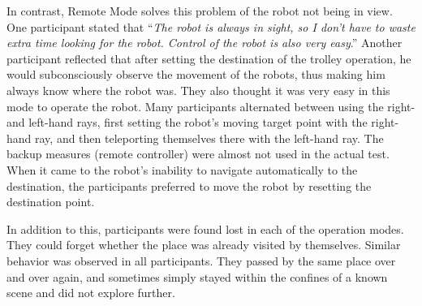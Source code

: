 In contrast, Remote Mode solves this problem of the robot not being in view. One participant stated that “\textit{The robot is always in sight, so I don't have to waste extra time looking for the robot. Control of the robot is also very easy}.” Another participant reflected that after setting the destination of the trolley operation, he would subconsciously observe the movement of the robots, thus making him always know where the robot was. They also thought it was very easy in this mode to operate the robot. Many participants alternated between using the right- and left-hand rays, first setting the robot's moving target point with the right-hand ray, and then teleporting themselves there with the left-hand ray. The backup measures (remote controller) were almost not used in the actual test. When it came to the robot's inability to navigate automatically to the destination, the participants preferred to move the robot by resetting the destination point.

In addition to this, participants were found lost in each of the operation modes. They could forget whether the place was already visited by themselves. Similar behavior was observed in all participants. They passed by the same place over and over again, and sometimes simply stayed within the confines of a known scene and did not explore further.

